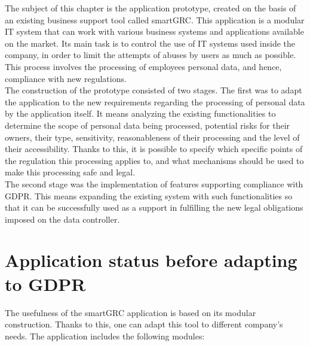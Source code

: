 \documentclass[en, noamssymb]{mgr}
\begin{document}
The subject of this chapter is the application prototype, created on the basis of an existing business support tool called smartGRC. This application is a modular IT system that can work with various business systems and applications available on the market. Its main task is to control the use of IT systems used inside the company, in order to limit the attempts of abuses by users as much as possible. This process involves the processing of employees personal data, and hence, compliance with new regulations.\\
\indent The construction of the prototype consisted of two stages. The first was to adapt the application to the new requirements regarding the processing of personal data by the application itself. It means analyzing the existing functionalities to determine the scope of personal data being processed, potential risks for their owners, their type, sensitivity, reasonableness of their processing and the level of their accessibility. Thanks to this, it is possible to specify which specific points of the regulation this processing applies to, and what mechanisms should be used to make this processing safe and legal.\\
\indent The second stage was the implementation of features supporting compliance with GDPR. This means expanding the existing system with such functionalities so that it can be successfully used as a support in fulfilling the new legal obligations imposed on the data controller.

\section{Application status before adapting to GDPR}

The usefulness of the smartGRC application is based on its modular construction. Thanks to this, one can adapt this tool to different company's needs. The application includes the following modules:
\end{document}
